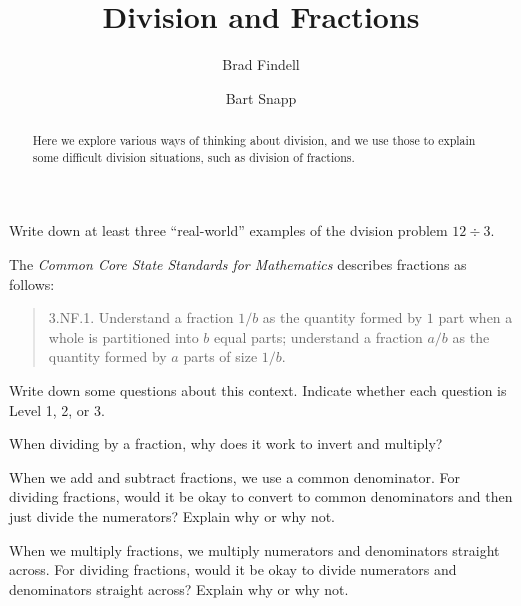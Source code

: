 \documentclass[handout]{ximera}
\title{Division and Fractions}
\author{Brad Findell \and Bart Snapp}
\begin{document}
\begin{abstract}
Here we explore various ways of thinking about division, and we use those to explain some difficult division situations, such as division of fractions.
\end{abstract}
\maketitle


\begin{problem}
Write down at least three ``real-world'' examples of the dvision problem $12\div 3$.  
\begin{freeResponse}
\end{freeResponse}
\vfill
\end{problem}

The \emph{Common Core State Standards for Mathematics} describes fractions as follows: 

\begin{quote}
3.NF.1. Understand a fraction $1/b$ as the quantity formed by $1$ part when a
whole is partitioned into $b$ equal parts; understand a fraction $a/b$ as
the quantity formed by $a$ parts of size $1/b$.
\end{quote}

\begin{problem}
Write down some questions about this context.  Indicate whether each question is Level 1, 2, or 3.  
\begin{freeResponse}
\end{freeResponse}
\vfill
\end{problem}


\begin{problem}
When dividing by a fraction, why does it work to invert and multiply?
\begin{freeResponse}
\end{freeResponse}
\vfill
\end{problem}

\newpage 

\begin{problem}
When we add and subtract fractions, we use a common denominator.  For dividing fractions, would it be okay to convert to common denominators and then just divide the numerators?  Explain why or why not. 
\begin{freeResponse}
\end{freeResponse}
\vfill
\end{problem}


\begin{problem}
When we multiply fractions, we multiply numerators and denominators straight across.  For dividing fractions, would it be okay to divide numerators and denominators straight across?  Explain why or why not. 
\begin{freeResponse}
\end{freeResponse}
\vfill
\end{problem}
\end{document}
